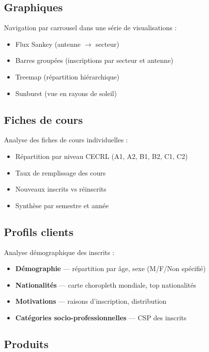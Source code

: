 \documentclass[12pt,a4paper,twoside]{article}
\begin{document}
\subsection{Graphiques}

Navigation par carrousel dans une s\'{e}rie de visualisations :
\begin{itemize}[leftmargin=2em]
  \item Flux Sankey (antenne $\rightarrow$ secteur)
  \item Barres group\'{e}es (inscriptions par secteur et antenne)
  \item Treemap (r\'{e}partition hi\'{e}rarchique)
  \item Sunburst (vue en rayons de soleil)
\end{itemize}

\subsection{Fiches de cours}

Analyse des fiches de cours individuelles :
\begin{itemize}[leftmargin=2em]
  \item R\'{e}partition par niveau CECRL (A1, A2, B1, B2, C1, C2)
  \item Taux de remplissage des cours
  \item Nouveaux inscrits vs r\'{e}inscrits
  \item Synth\`{e}se par semestre et ann\'{e}e
\end{itemize}

\subsection{Profils clients}

Analyse d\'{e}mographique des inscrits :
\begin{itemize}[leftmargin=2em]
  \item \textbf{D\'{e}mographie} --- r\'{e}partition par \^{a}ge, sexe (M/F/Non sp\'{e}cifi\'{e})
  \item \textbf{Nationalit\'{e}s} --- carte choropleth mondiale, top nationalit\'{e}s
  \item \textbf{Motivations} --- raisons d'inscription, distribution
  \item \textbf{Cat\'{e}gories socio-professionnelles} --- CSP des inscrits
\end{itemize}

\subsection{Produits}
\end{document}
